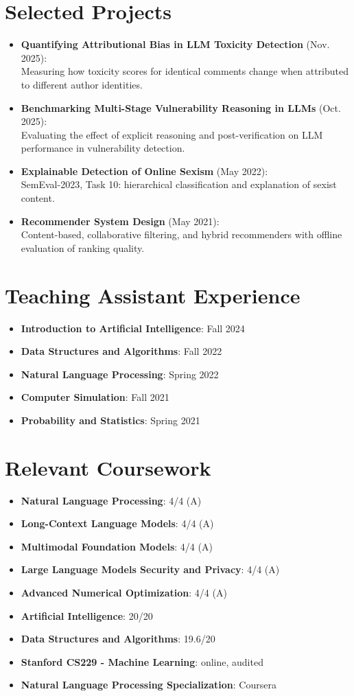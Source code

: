 \documentclass[letterpaper,10pt]{article}
\newcommand{\cvProject}[3]{\item \textbf{#1} (#2):\\ #3}
\newenvironment{cvflat}
  {\begin{itemize}[leftmargin=0.16in,label=\textbullet,itemsep=2pt,parsep=0pt,topsep=4pt,partopsep=0pt]\small}
  {\end{itemize}}
\begin{document}
\section{Selected Projects}
\begin{cvflat}
  \cvProject{Quantifying Attributional Bias in LLM Toxicity Detection}{Nov. 2025}
    {Measuring how toxicity scores for identical comments change when attributed to different author identities.}
  \cvProject{Benchmarking Multi-Stage Vulnerability Reasoning in LLMs}{Oct. 2025}
    {Evaluating the effect of explicit reasoning and post-verification on LLM performance in vulnerability detection.}
  \cvProject{Explainable Detection of Online Sexism}{May 2022}
    {SemEval-2023, Task 10: hierarchical classification and explanation of sexist content.}
  \cvProject{Recommender System Design}{May 2021}
    {Content-based, collaborative filtering, and hybrid recommenders with offline evaluation of ranking quality.}
\end{cvflat}

\section{Teaching Assistant Experience}
\begin{cvflat}
  \item \textbf{Introduction to Artificial Intelligence}: Fall 2024
  \item \textbf{Data Structures and Algorithms}: Fall 2022
  \item \textbf{Natural Language Processing}: Spring 2022
  \item \textbf{Computer Simulation}: Fall 2021
  \item \textbf{Probability and Statistics}: Spring 2021
\end{cvflat}

\section{Relevant Coursework}
\begin{cvflat}
  \item \textbf{Natural Language Processing}: 4/4 (A)
  \item \textbf{Long-Context Language Models}: 4/4 (A)
  \item \textbf{Multimodal Foundation Models}: 4/4 (A)
  \item \textbf{Large Language Models Security and Privacy}: 4/4 (A)
  \item \textbf{Advanced Numerical Optimization}: 4/4 (A)
  \item \textbf{Artificial Intelligence}: 20/20
  \item \textbf{Data Structures and Algorithms}: 19.6/20
  \item \textbf{Stanford CS229 - Machine Learning}: online, audited
  \item \textbf{Natural Language Processing Specialization}: Coursera
\end{cvflat}
\end{document}
